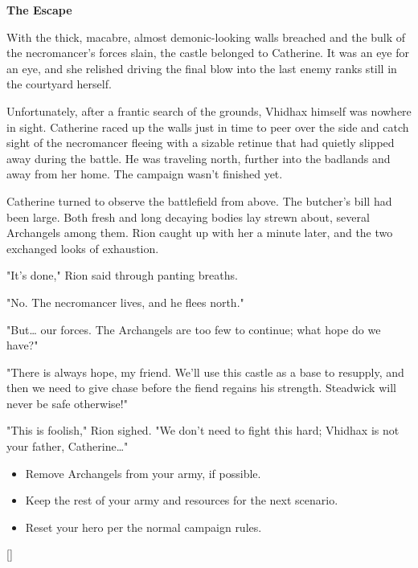 \begin{multicols*}{2}
\textbf{The Escape}

With the thick, macabre, almost demonic-looking walls breached and the bulk of the necromancer's forces slain, the castle belonged to Catherine. It was an eye for an eye, and she relished driving the final blow into the last enemy ranks still in the courtyard herself. 

Unfortunately, after a frantic search of the grounds, Vhidhax himself was nowhere in sight. Catherine raced up the walls just in time to peer over the side and catch sight of the necromancer fleeing with a sizable retinue that had quietly slipped away during the battle. He was traveling north, further into the badlands and away from her home. The campaign wasn't finished yet.

Catherine turned to observe the battlefield from above. The butcher's bill had been large. Both fresh and long decaying bodies lay strewn about, several Archangels among them. Rion caught up with her a minute later, and the two exchanged looks of exhaustion.

"It's done," Rion said through panting breaths.

"No. The necromancer lives, and he flees north."

"But… our forces. The Archangels are too few to continue; what hope do we have?"

"There is always hope, my friend. We'll use this castle as a base to resupply, and then we need to give chase before the fiend regains his strength. Steadwick will never be safe otherwise!"

"This is foolish," Rion sighed. "We don't need to fight this hard; Vhidhax is not your father, Catherine…"

\begin{itemize}
  \item \textcolor{darkcandyapplered}{Remove Archangels from your army, if possible.}
  \item \textcolor{darkcandyapplered}{Keep the rest of your army and resources for the next scenario.}
  \item \textcolor{darkcandyapplered}{Reset your hero per the normal campaign rules.}
\end{itemize}

\vspace{2em}
\begin{center}
  \raisebox{0pt}[\dimexpr{}\baselineskip\relax]{}
\end{center}

\end{multicols*}



